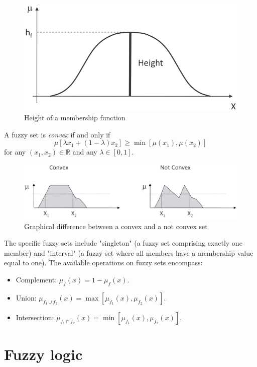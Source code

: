 \documentclass[12pt, a4paper]{report}
\begin{document}
    \begin{figure}[H]
        \centering
        \includegraphics[width=0.4\linewidth]{images/height.png}
        \caption{Height of a membership function}
    \end{figure}
    \begin{definition}
        A fuzzy set is \emph{convex} if and only if 
        \[\mu[\lambda x_1+(1-\lambda)x_2] \geq \min [\mu(x_1),\mu(x_2)]\]
        for any $(x_1,x_2) \in \mathbb{R}$ and any $\lambda \in [0,1]$.
    \end{definition}
    \begin{figure}[H]
        \centering
        \includegraphics[width=0.75\linewidth]{images/convex.png}
        \caption{Graphical difference between a convex and a not convex set}
    \end{figure}
    The specific fuzzy sets include "singleton" (a fuzzy set comprising exactly one member) and "interval" (a fuzzy set where all members have a membership value equal to one). 
    The available operations on fuzzy sets encompass:
    \begin{itemize}
        \item Complement: $\mu_{\bar{f}}(x)=1-\mu_f(x)$.
        \item Union: $\mu_{f_1 \cup f_2}(x)=\max [\mu_{f_1}(x),\mu_{f_2}(x)]$.
        \item Intersection: $\mu_{f_1 \cap f_2}(x)=\min [\mu_{f_1}(x),\mu_{f_2}(x)]$.
    \end{itemize}

    \newpage

    \chapter{Fuzzy logic}
\end{document}
